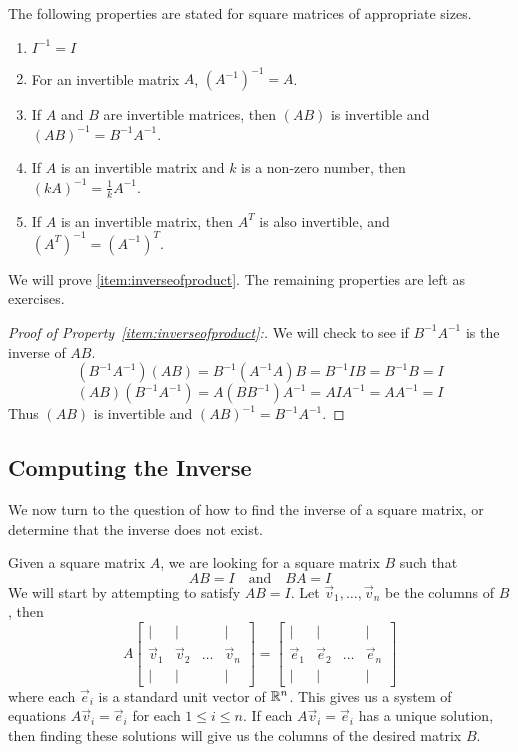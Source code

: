 \documentclass{ximera}
\begin{document}
\begin{theorem}\label{th:invprop} The following properties are stated for square matrices of appropriate sizes.
\begin{enumerate}
\item \label{item:inverseofid} $I^{-1}=I$
\item \label{item:inverseofinverse} For an invertible matrix $A$, $(A^{-1})^{-1}=A$.
\item \label{item:inverseofproduct} If $A$ and $B$ are invertible matrices, then $(AB)$ is invertible and $(AB)^{-1}=B^{-1}A^{-1}$.
\item \label{item:inversekA} If $A$ is an invertible matrix and $k$ is a non-zero number, then $(kA)^{-1}=\frac{1}{k}A^{-1}$.
\item \label{item:inversetranspose} If $A$ is an invertible matrix, then $A^T$ is also invertible, and $(A^T)^{-1}=(A^{-1})^T$.
\end{enumerate}
\end{theorem}
We will prove \ref{item:inverseofproduct}.  The remaining properties are left as exercises.
\begin{proof}[Proof of Property~\ref{item:inverseofproduct}:]
We will check to see if $B^{-1}A^{-1}$ is the inverse of $AB$.
$$(B^{-1}A^{-1})(AB)=B^{-1}(A^{-1}A)B=B^{-1}IB=B^{-1}B=I$$
$$(AB)(B^{-1}A^{-1})=A(BB^{-1})A^{-1}=AIA^{-1}=AA^{-1}=I$$
Thus $(AB)$ is invertible and $(AB)^{-1}=B^{-1}A^{-1}$.
\end{proof}

\subsection*{Computing the Inverse}
We now turn to the question of how to find the inverse of a square matrix, or determine that the inverse does not exist.  

Given a square matrix $A$, we are looking for a square matrix $B$ such that $$AB=I\quad\text{and}\quad BA=I$$
We will start by attempting to satisfy $AB=I$.
Let $\vec{v}_1,\ldots,\vec{v}_n$ be the columns of $B$, then
$$A\begin{bmatrix}
           | & |& &|\\
		\vec{v}_1 & \vec{v}_2 &\dots &\vec{v}_n\\
		|&| & &|
         \end{bmatrix}=\begin{bmatrix}
           | & |& &|\\
		\vec{e}_1 & \vec{e}_2 &\dots &\vec{e}_n\\
		|&| & &|
         \end{bmatrix}$$
where each $\vec{e}_i$ is a standard unit vector of $\mathbb{R}^n$.   This gives us a system of equations $A\vec{v}_i=\vec{e}_i$ for each $1\leq i\leq n$.  If each $A\vec{v}_i=\vec{e}_i$ has a unique solution, then finding these solutions will give us the columns of the desired matrix $B$.  
\end{document}
